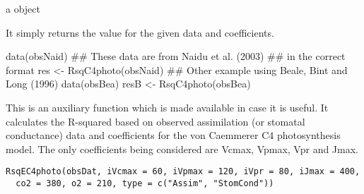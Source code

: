 \documentclass[letterpaper]{book}
\begin{document}
%
\begin{Value}
a  object

It simply returns the  value for the given data
and coefficients.
\end{Value}
%
\begin{Examples}
\begin{ExampleCode}
data(obsNaid)
## These data are from Naidu et al. (2003)
## in the correct format
res <- RsqC4photo(obsNaid)
## Other example using Beale, Bint and Long (1996)
data(obsBea)
resB <- RsqC4photo(obsBea)
\end{ExampleCode}
\end{Examples}
%
\begin{Description}\relax
This is an auxiliary function which is made available in
case it is useful. It calculates the R-squared based on
observed assimilation (or stomatal conductance) data and
coefficients for the von Caemmerer C4 photosynthesis model.
The only coefficients being considered are Vcmax, Vpmax,
Vpr and Jmax.
\end{Description}
%
\begin{Usage}
\begin{verbatim}
RsqEC4photo(obsDat, iVcmax = 60, iVpmax = 120, iVpr = 80, iJmax = 400,
  co2 = 380, o2 = 210, type = c("Assim", "StomCond"))
\end{verbatim}
\end{Usage}
%
\end{document}
